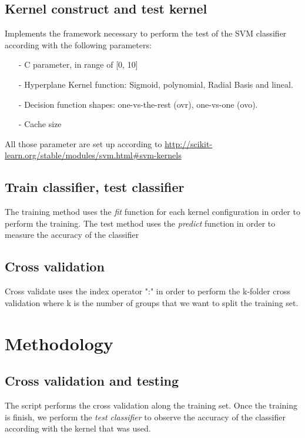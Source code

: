 \documentclass[11pt,a4paper]{article}
\begin{document}
\subsection{Kernel construct and test kernel}

Implements the framework necessary to perform the test of the SVM classifier according with the following parameters:   
\begin{itemize}
\item[-] C parameter, in range of [0, 10]  
\item[-] Hyperplane Kernel function: Sigmoid, polynomial, Radial Basis and lineal.  
\item[-] Decision function shapes: one-vs-the-rest (ovr), one-vs-one (ovo). 
\item[-] Cache size   	
\end{itemize}

All those parameter are set up according to \url{http://scikit-learn.org/stable/modules/svm.html#svm-kernels}

\subsection{Train classifier, test classifier}

The training method uses the \textit{fit} function for each kernel configuration in order to perform the training. The test method uses the \textit{predict} function in order to measure the accuracy of the classifier  


\subsection{Cross validation}

Cross validate uses the index operator ":" in order to perform the k-folder cross validation where k is the number of groups that we want to split the training set.    

\section{Methodology}

\subsection{Cross validation and testing}

The script performs the cross validation along the training set. Once the training is finish, we perform the \textit{test classifier} to observe the accuracy of the classifier according with the kernel that was used.  
\end{document}
